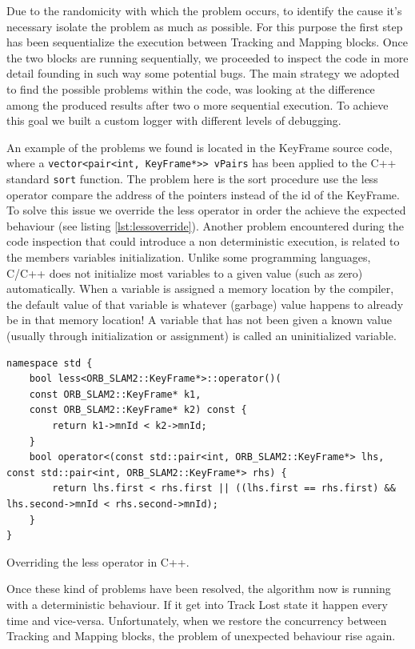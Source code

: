 Due to the randomicity with which the problem occurs, to identify the cause it's necessary isolate the problem as much as possible. For this purpose the first step has been sequentialize the execution between Tracking and Mapping blocks.
Once the two blocks are running sequentially, we proceeded to inspect the code in more detail founding in such way some potential bugs.
The main strategy we adopted to find the possible problems within the code, was looking at the difference among the produced results after two o more sequential execution. To achieve this goal we built a custom logger with different levels of debugging.

An example of the problems we found is located in the KeyFrame source code, where a \texttt{vector<pair<int, KeyFrame*>> vPairs} has been applied to the C++ standard \texttt{sort} function. The problem here is the sort procedure use the less operator compare the address of the pointers instead of the id of the KeyFrame.
To solve this issue we override the less operator in order the achieve the expected behaviour (see listing \ref{lst:lessoverride}).
Another problem encountered during the code inspection that could introduce a non deterministic execution, is related to the members variables initialization.
Unlike some programming languages, C/C++ does not initialize most variables to a given value (such as zero) automatically. When a variable is assigned a memory location by the compiler, the default value of that variable is whatever (garbage) value happens to already be in that memory location! A variable that has not been given a known value (usually through initialization or assignment) is called an uninitialized variable.

\begin{listing}[tbp]
\begin{verbatim}
namespace std {
    bool less<ORB_SLAM2::KeyFrame*>::operator()(
    const ORB_SLAM2::KeyFrame* k1,
    const ORB_SLAM2::KeyFrame* k2) const {
        return k1->mnId < k2->mnId;
    }
    bool operator<(const std::pair<int, ORB_SLAM2::KeyFrame*> lhs, const std::pair<int, ORB_SLAM2::KeyFrame*> rhs) {
        return lhs.first < rhs.first || ((lhs.first == rhs.first) && lhs.second->mnId < rhs.second->mnId);
    }
}
\end{verbatim} 
\caption{Overriding the less operator in C++.}
\label{lst:lessoverride}
\end{listing}

Once these kind of problems have been resolved, the algorithm now is running with a deterministic behaviour. If it get into Track Lost state it happen every time and vice-versa. Unfortunately, when we restore the concurrency between Tracking and Mapping blocks, the problem of unexpected behaviour rise again.

